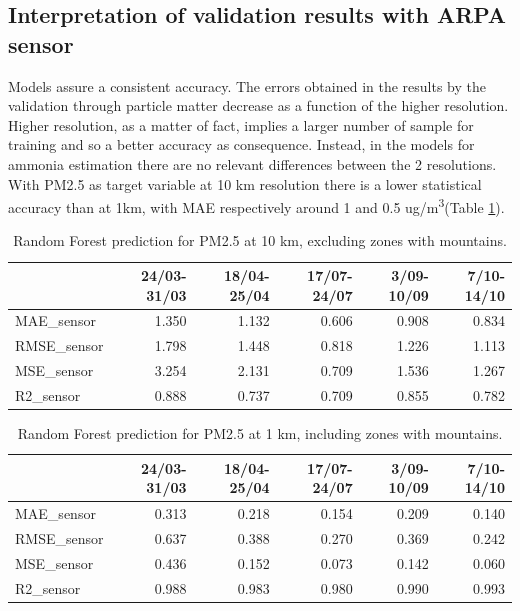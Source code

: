 \subsection{Interpretation of validation results with ARPA sensor}
Models assure a consistent accuracy.
The errors obtained in the results by the validation through particle matter decrease as a function of the higher resolution.
Higher resolution, as a matter of fact, implies a larger number of sample for training and so a better accuracy as consequence.
Instead, in the models for ammonia estimation there are no relevant differences between the 2 resolutions.
With PM2.5 as target variable at 10 km resolution there is a lower statistical accuracy than at 1km, with MAE respectively around 1 and 0.5 ug/m\textsuperscript{3}(Table \ref{tab:res1km}). 
\begin{table}[H]
\begin{tabular}{lrrrrr}
\toprule
  &  24/03-31/03 &  18/04-25/04 &  17/07-24/07 &  3/09-10/09 &  7/10-14/10 \\
\midrule
 MAE\_sensor &        1.350 &        1.132 &        0.606 &       0.908 &       0.834 \\
RMSE\_sensor &        1.798 &        1.448 &        0.818 &       1.226 &       1.113 \\
 MSE\_sensor &        3.254 &        2.131 &        0.709 &       1.536 &       1.267 \\
  R2\_sensor &        0.888 &        0.737 &        0.709 &       0.855 &       0.782 \\
\bottomrule
\end{tabular}
\caption{Random Forest prediction for PM2.5 at 10 km, excluding zones with mountains.}
\end{table}
\begin{table}[H]
\begin{tabular}{lrrrrr}
\toprule
  &  24/03-31/03 &  18/04-25/04 &  17/07-24/07 &  3/09-10/09 &  7/10-14/10 \\
\midrule
 MAE\_sensor &        0.313 &        0.218 &        0.154 &       0.209 &       0.140 \\
RMSE\_sensor &        0.637 &        0.388 &        0.270 &       0.369 &       0.242 \\
 MSE\_sensor &        0.436 &        0.152 &        0.073 &       0.142 &       0.060 \\
  R2\_sensor &        0.988 &        0.983 &        0.980 &       0.990 &       0.993 \\
\bottomrule
\end{tabular}
\caption{Random Forest prediction for PM2.5 at 1 km, including zones with mountains.}
\label{tab:res1km}
\end{table}

